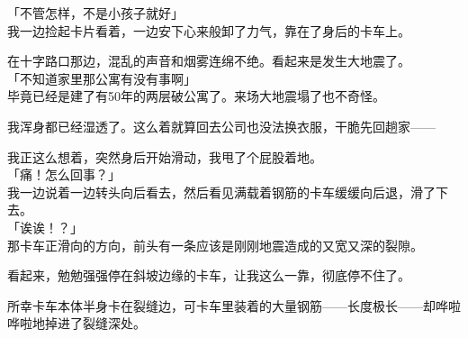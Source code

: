 「不管怎样，不是小孩子就好」\\

我一边捡起卡片看着，一边安下心来般卸了力气，靠在了身后的卡车上。

在十字路口那边，混乱的声音和烟雾连绵不绝。看起来是发生大地震了。\\

「不知道家里那公寓有没有事啊」\\

毕竟已经是建了有50年的两层破公寓了。来场大地震塌了也不奇怪。

我浑身都已经湿透了。这么着就算回去公司也没法换衣服，干脆先回趟家——

我正这么想着，突然身后开始滑动，我甩了个屁股着地。\\

「痛！怎么回事？」\\

我一边说着一边转头向后看去，然后看见满载着钢筋的卡车缓缓向后退，滑了下去。\\

「诶诶！？」\\

那卡车正滑向的方向，前头有一条应该是刚刚地震造成的又宽又深的裂隙。

看起来，勉勉强强停在斜坡边缘的卡车，让我这么一靠，彻底停不住了。

所幸卡车本体半身卡在裂缝边，可卡车里装着的大量钢筋——长度极长——却哗啦哗啦地掉进了裂缝深处。\\


